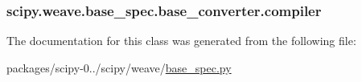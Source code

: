 \subsubsection[{compiler}]{\setlength{\rightskip}{0pt plus 5cm}scipy.\+weave.\+base\+\_\+spec.\+base\+\_\+converter.\+compiler}\label{classscipy_1_1weave_1_1base__spec_1_1base__converter_ac3e39191fffe91b942d5afe4a64c3f36}


The documentation for this class was generated from the following file\+:\begin{DoxyCompactItemize}
\item 
packages/scipy-\/0../scipy/weave/\hyperlink{base__spec_8py}{base\+\_\+spec.\+py}\end{DoxyCompactItemize}
